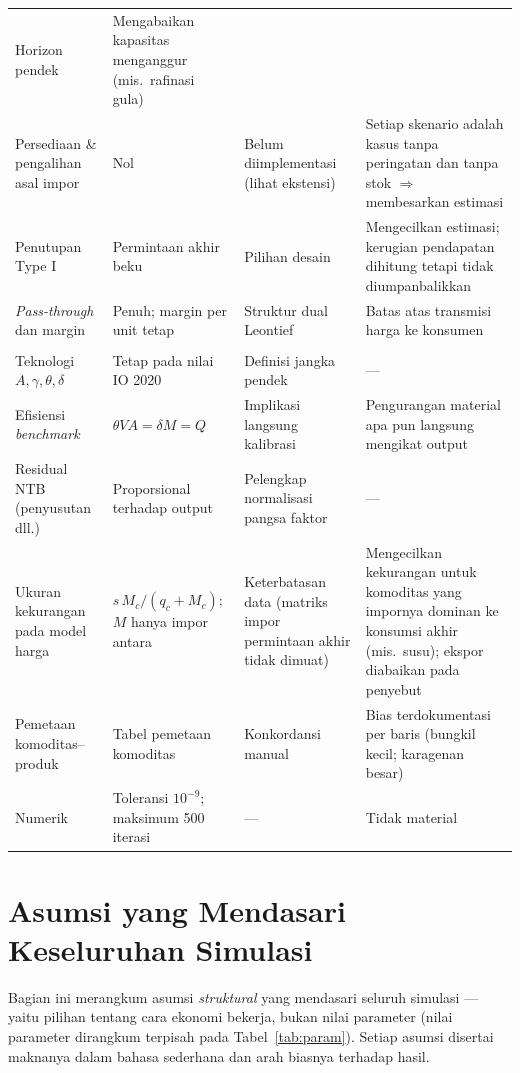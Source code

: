 \documentclass[
  manuscript=article,
  layout=publish,
  year=2026,
  volume=1,
]{den}
\newcommand{\en}[1]{\textit{#1}}
\begin{document}
\begin{landscape}
\begin{longtable}{@{}p{3.6cm}p{3.6cm}p{6.5cm}p{7.5cm}@{}}
Horizon pendek &
Mengabaikan kapasitas menganggur (mis.\ rafinasi gula) \\
Persediaan \& pengalihan asal impor &
Nol &
Belum diimplementasi (lihat ekstensi) &
Setiap skenario adalah kasus tanpa peringatan dan tanpa stok $\Rightarrow$
membesarkan estimasi \\
Penutupan Type I &
Permintaan akhir beku &
Pilihan desain &
Mengecilkan estimasi; kerugian pendapatan dihitung tetapi tidak
diumpanbalikkan \\
\en{Pass-through} dan margin &
Penuh; margin per unit tetap &
Struktur dual Leontief &
Batas atas transmisi harga ke konsumen \\
\addlinespace[5pt]
\multicolumn{4}{@{}l}{\emph{Tier 3 --- konvensi kalibrasi}}\\
\addlinespace[2pt]
Teknologi $A, \gamma, \theta, \delta$ &
Tetap pada nilai IO 2020 &
Definisi jangka pendek &
--- \\
Efisiensi \en{benchmark} &
$\theta VA = \delta M = Q$ &
Implikasi langsung kalibrasi &
Pengurangan material apa pun langsung mengikat output \\
Residual NTB (penyusutan dll.) &
Proporsional terhadap output &
Pelengkap normalisasi pangsa faktor &
--- \\
Ukuran kekurangan pada model harga &
$s\,M_c/(q_c + M_c)$; $M$ hanya impor antara &
Keterbatasan data (matriks impor permintaan akhir tidak dimuat) &
Mengecilkan kekurangan untuk komoditas yang impornya dominan ke konsumsi
akhir (mis.\ susu); ekspor diabaikan pada penyebut \\
Pemetaan komoditas--produk &
Tabel pemetaan komoditas &
Konkordansi manual &
Bias terdokumentasi per baris (bungkil kecil; karagenan besar) \\
Numerik &
Toleransi $10^{-9}$; maksimum 500 iterasi &
--- &
Tidak material \\
\bottomrule
\end{longtable}
\end{landscape}

\section{Asumsi yang Mendasari Keseluruhan Simulasi}\label{sec-asumsi}

Bagian ini merangkum asumsi \emph{struktural} yang mendasari seluruh
simulasi --- yaitu pilihan tentang cara ekonomi bekerja, bukan nilai
parameter (nilai parameter dirangkum terpisah pada
Tabel~\ref{tab:param}). Setiap asumsi disertai maknanya dalam bahasa
sederhana dan arah biasnya terhadap hasil.
\end{document}
